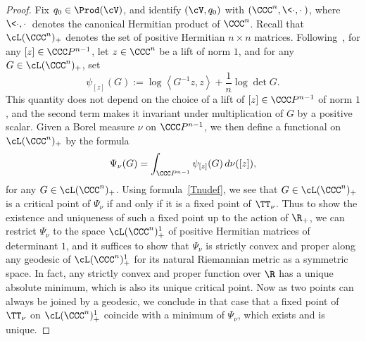 \goodbreak
\begin{proof}
Fix $q_0\in\Prod(\cV)$, and identify $(\cV,q_0)$ with $(\CCC^n,\<\cdot,\cdot\>)$, where $\<\cdot,\cdot\>$ denotes the canonical Hermitian product of $\CCC^n$. Recall that $\cL(\CCC^n)_+$ denotes the set of positive Hermitian $n\times n$ matrices. Following~\cite[p.~582]{D}, for any $[z]\in\CCC P^{n-1}$, let $z\in\CCC^n$ be a lift of norm $1$, and for any $G\in\cL(\CCC^n)_+$, set
\begin{equation}\label{psizdef}
\psi_{[z]}(G):=\log\left\langle G^{-1}z,z\right\rangle +\frac{1}{n}\log\det G.
\end{equation}
This quantity does not depend on the choice of a lift of $[z]\in\CCC P^{n-1}$ of norm $1$, and the second term makes it invariant under multiplication of $G$ by a positive scalar. Given a Borel measure $\nu$ on $\CCC P^{n-1}$, we then define a functional on $\cL(\CCC^n)_+$ by the formula
\begin{equation}\label{Psinudef}
\Psi_\nu(G)=\int_{\CCC P^{n-1}}\psi_{[z]}(G)\,d\nu([z]),
\end{equation}
for any $G\in\cL(\CCC^n)_+$. Using formula~\eqref{Tnudef}, we see that $G\in\cL(\CCC^n)_+$ is a critical point of $\Psi_\nu$ if and only if it is a fixed point of $\TT_\nu$. Thus to show the existence and uniqueness of such a fixed point up to the action of $\R_+$, we can restrict $\Psi_\nu$ to the space $\cL(\CCC^n)_+^1$ of positive Hermitian matrices of determinant $1$, and it suffices to show that $\Psi_\nu$ is strictly convex and proper along any geodesic of $\cL(\CCC^n)_+^1$ for its natural Riemannian metric as a symmetric space. In fact, any strictly convex and proper function over $\R$ has a unique absolute minimum, which is also its unique critical point. Now as two points can always be joined by a geodesic, we conclude in that case that a fixed point of $\TT_\nu$ on $\cL(\CCC^n)_+^1$ coincide with a minimum of $\Psi_\nu$, which exists and is unique.


\end{proof}
